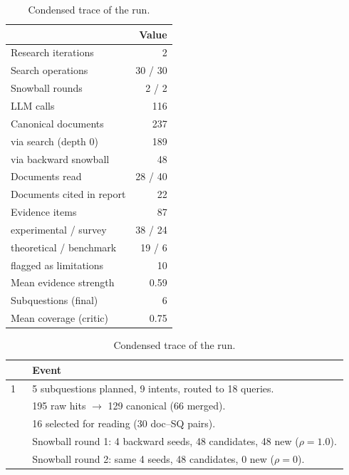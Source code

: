 \documentclass[10pt,a4paper]{article}
\newcommand{\hfont}{\sffamily}
\newcommand{\headrow}{\rowcolor{tablehead}}
\newcommand{\tcol}[1]{{\hfont\bfseries\footnotesize\color{accent}#1}}
\begin{document}
\begin{table}[t]
\centering
\small
\begin{minipage}[t]{0.44\linewidth}
\centering
\caption{Run summary.}
\label{tab:case}
\begin{tabular}{@{}lr@{}}
\toprule
\headrow \tcol{Metric} & \tcol{Value} \\
\midrule
Research iterations          & 2 \\
Search operations            & 30 / 30 \\
Snowball rounds              & 2 / 2 \\
LLM calls                    & 116 \\
Canonical documents          & 237 \\
\quad via search (depth 0)   & 189 \\
\quad via backward snowball  & 48 \\
Documents read               & 28 / 40 \\
Documents cited in report    & 22 \\
Evidence items               & 87 \\
\quad experimental / survey  & 38 / 24 \\
\quad theoretical / benchmark& 19 / 6 \\
\quad flagged as limitations & 10 \\
Mean evidence strength       & 0.59 \\
Subquestions (final)         & 6 \\
Mean coverage (critic)       & 0.75 \\
\bottomrule
\end{tabular}
\end{minipage}%
\hfill
\begin{minipage}[t]{0.53\linewidth}
\centering
\caption{Condensed trace of the run.}
\label{tab:trace}
\begin{tabular}{@{}p{0.06\linewidth}p{0.88\linewidth}@{}}
\toprule
\headrow \tcol{It.} & \tcol{Event} \\
\midrule
1 & 5 subquestions planned, 9 intents, routed to 18 queries. \\
  & 195 raw hits $\to$ 129 canonical (66 merged). \\
  & 16 selected for reading (30 doc--SQ pairs). \\
  & Snowball round 1: 4 backward seeds, 48 candidates, 48 new ($\rho=1.0$). \\
  & Snowball round 2: same 4 seeds, 48 candidates, 0 new ($\rho=0$). \\

\end{tabular}
\end{minipage}
\end{table}
\end{document}

